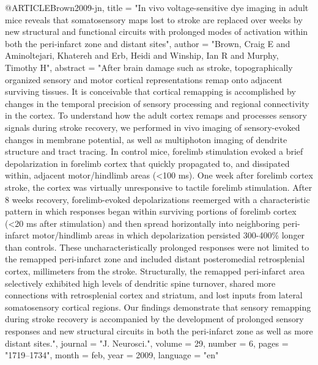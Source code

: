 @ARTICLE{Brown2009-jn,
	title    = "In vivo voltage-sensitive dye imaging in adult mice reveals that
	somatosensory maps lost to stroke are replaced over weeks by new
	structural and functional circuits with prolonged modes of
	activation within both the peri-infarct zone and distant sites",
	author   = "Brown, Craig E and Aminoltejari, Khatereh and Erb, Heidi and
	Winship, Ian R and Murphy, Timothy H",
	abstract = "After brain damage such as stroke, topographically organized
	sensory and motor cortical representations remap onto adjacent
	surviving tissues. It is conceivable that cortical remapping is
	accomplished by changes in the temporal precision of sensory
	processing and regional connectivity in the cortex. To understand
	how the adult cortex remaps and processes sensory signals during
	stroke recovery, we performed in vivo imaging of sensory-evoked
	changes in membrane potential, as well as multiphoton imaging of
	dendrite structure and tract tracing. In control mice, forelimb
	stimulation evoked a brief depolarization in forelimb cortex that
	quickly propagated to, and dissipated within, adjacent
	motor/hindlimb areas (<100 ms). One week after forelimb cortex
	stroke, the cortex was virtually unresponsive to tactile forelimb
	stimulation. After 8 weeks recovery, forelimb-evoked
	depolarizations reemerged with a characteristic pattern in which
	responses began within surviving portions of forelimb cortex (<20
	ms after stimulation) and then spread horizontally into
	neighboring peri-infarct motor/hindlimb areas in which
	depolarization persisted 300-400\% longer than controls. These
	uncharacteristically prolonged responses were not limited to the
	remapped peri-infarct zone and included distant posteromedial
	retrosplenial cortex, millimeters from the stroke. Structurally,
	the remapped peri-infarct area selectively exhibited high levels
	of dendritic spine turnover, shared more connections with
	retrosplenial cortex and striatum, and lost inputs from lateral
	somatosensory cortical regions. Our findings demonstrate that
	sensory remapping during stroke recovery is accompanied by the
	development of prolonged sensory responses and new structural
	circuits in both the peri-infarct zone as well as more distant
	sites.",
	journal  = "J. Neurosci.",
	volume   =  29,
	number   =  6,
	pages    = "1719--1734",
	month    =  feb,
	year     =  2009,
	language = "en"
}

